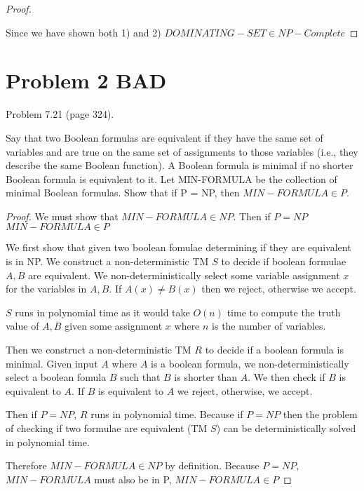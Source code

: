 \documentclass[11pt]{article}
\begin{document}
\begin{proof}
\begin{enumerate}[label=\alph*)]
\end{enumerate}

Since we have shown both 1) and 2) $DOMINATING-SET \in NP-Complete$

\end{proof}


















\newpage
\section*{Problem 2 BAD}

Problem 7.21 (page 324).

Say that two Boolean formulas are equivalent if they have the same set of variables
and are true on the same set of assignments to those variables (i.e., they describe
the same Boolean function). A Boolean formula is minimal if no shorter Boolean
formula is equivalent to it. Let MIN-FORMULA be the collection of minimal
Boolean formulas. Show that if P = NP, then $MIN-FORMULA \in P$.


\begin{proof}


We must show that $MIN-FORMULA \in NP$. Then if $P = NP$ $MIN-FORMULA \in P$


We first show that given two boolean fomulae determining if they are equivalent is in NP. We construct a non-deterministic TM $S$ to decide if boolean formulae $A, B$ are equivalent. We non-deterministically select some variable assignment $x$ for the variables in $A, B$. If $A(x) \neq B(x)$ then we reject, otherwise we accept. 

$S$ runs in polynomial time as it would take $O(n)$ time to compute the truth value of $A, B$ given some assignment $x$ where $n$ is the number of variables. 



Then we construct a non-deterministic TM $R$ to decide if a boolean formula is minimal. Given input $A$ where $A$ is a boolean formula, we non-deterministically select a boolean fomula $B$ such that $B$ is shorter than $A$. We then check if $B$ is equivalent to $A$. If $B$ is equivalent to $A$ we reject, otherwise, we accept. 

Then if $P = NP$, $R$ runs in polynomial time. Because if $P = NP$ then the problem of checking if two formulae are equivalent (TM $S$) can be deterministically solved in polynomial time. 

Therefore $MIN-FORMULA \in NP$ by definition. Because $P = NP$, $MIN-FORMULA$ must also be in P, $MIN-FORMULA \in P$

\end{proof}
\end{document}
